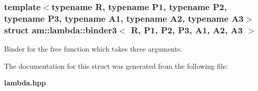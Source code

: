 \subsubsection*{template$<$typename R, typename P1, typename P2, typename P3, typename A1, typename A2, typename A3$>$ struct am::lambda::binder3$<$ R, P1, P2, P3, A1, A2, A3 $>$}

Binder for the free function which takes three arguments. 



The documentation for this struct was generated from the following file:\begin{CompactItemize}
\item 
{\bf lambda.hpp}\end{CompactItemize}

